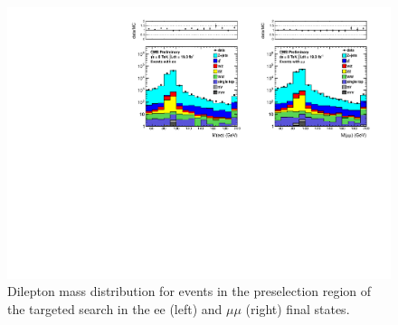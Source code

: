 \begin{figure}[hbt]
  \begin{center}
	\includegraphics[width=1.0\linewidth]{plots/dilmass_targeted_19fb.pdf}
	\caption{
	  \label{fig:dilmass_2j_targeted}\protect 
	  Dilepton mass distribution for events in the preselection region of the targeted search
	  in the ee (left) and $\mu\mu$ (right) final states.}




  \end{center}
\end{figure}

